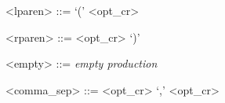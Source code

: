 \vs

\begin{grammar}
  <rbrace> ::= <opt_cr> `}'
\end{grammar}

\vs

\begin{grammar}
  <lparen> ::= `(' <opt_cr>
\end{grammar}

\vs

\begin{grammar}
  <rparen> ::= <opt_cr> `)'
\end{grammar}

\vs

\begin{grammar}
  <empty> ::= \emph{empty production}
\end{grammar}

\vs

\begin{grammar}
  <comma_sep> ::= <opt_cr> `,' <opt_cr>
\end{grammar}





